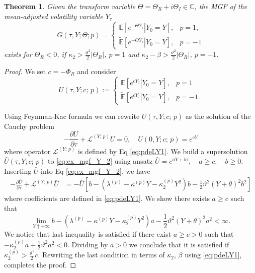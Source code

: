 \documentclass[11pt,a4paper] {article}
\newtheorem{theorem}{Theorem}[section]
\begin{document}
\begin{theorem}\label{thm::existence_MGF_Y}
Given the transform variable $\Theta=\Theta_R+i\Theta_I\in \mathbb{C}$, the MGF of the mean-adjusted volatility variable $Y_\tau$
\begin{equation*}
G(\tau,Y;\Theta;p)=
\begin{cases}
\mathbb{E}[\left. e^{-\Theta Y_\tau}\right|Y_0=Y], & p=1,\\
\tilde{\mathbb{E}}[\left. e^{-\Theta Y_\tau}\right|Y_0=Y], & p=-1
\end{cases}
\end{equation*}
exists for $\Theta_R<0$, if $\kappa_2>\frac{\vartheta^2}{2}|\Theta_R|$, $p=1$ and $\kappa_2-\beta>\frac{\vartheta^2}{2}|\Theta_R|$, $p=-1$.
\end{theorem}
\begin{proof}
We set $c=-\Phi_R$ and consider
\begin{equation} \label{eq:mgf_Y_1}
U(\tau,Y; c;\,p) := 
\begin{cases}
\mathbb{E}[e^{cY_\tau}\left.\right|Y_0=Y], & p=1\\
\tilde{\mathbb{E}}[e^{cY_\tau}\left.\right|Y_0=Y], & p=-1.
\end{cases}
\end{equation}

Using Feynman-Kac formula we can rewrite $U(\tau,Y; c;\,p)$ as the solution of the Cauchy problem
\begin{equation}\label{eq:ex_mgf_Y_2}
-\frac{\partial U}{\partial\tau}+\mathcal{L}^{(Y;\,p)}U=0,\quad 
U(0,Y;c;\,p)=e^{cY}
\end{equation}
where operator $\mathcal{L}^{(Y;\,p)}$ is defined by Eq \eqref{eq:pdeLY1}.
We build a supersolution $\bar{U}(\tau,Y; c;\,p)$ to \eqref{eq:ex_mgf_Y_2} using ansatz  
$
\bar{U}=e^{aY+b\tau},\quad a\ge c, \quad b\ge 0
$. 
Inserting $\bar{U}$ into Eq \eqref{eq:ex_mgf_Y_2}, we have
\begin{equation}\label{eq:ex_mgf_Y_3}
\begin{split}
-\frac{\partial \bar{U}}{\partial\tau}+\mathcal{L}^{(Y;\,p)}\bar{U}&=
-\bar{U}\left[b-\left(\lambda^{(p)} - \kappa^{(p)} Y   - \kappa_{2}^{(p)}Y^{2}\right)b-\frac{1}{2} \vartheta^{2} (Y+\theta)^{2}b^2\right]
\end{split}
\end{equation}
where coefficients are defined in \eqref{eq:pdeLY1}. 
We show there exists $a\ge c$ such that
\begin{equation*}
\lim_{Y\uparrow+\infty}b-\left(\lambda^{(p)} - \kappa^{(p)} Y   - \kappa_{2}^{(p)}Y^{2}\right)a-\frac{1}{2} \vartheta^{2} (Y+\theta)^{2}a^2<\infty.
\end{equation*}
We notice that last inequality is satisfied if there exist $a\ge c>0$ such that
$
-\kappa_{2}^{(p)}a+\frac{1}{2} \vartheta^{2}a^2<0
$. 
Dividing by $a>0$ we conclude that it is satisfied if
$
\kappa_{2}^{(p)}>\frac{\vartheta^2}{2}c. 
$
Rewriting the last condition in terms of $\kappa_2$, $\beta$ using \eqref{eq:pdeLY1}, completes the proof.
\end{proof}
\end{document}
